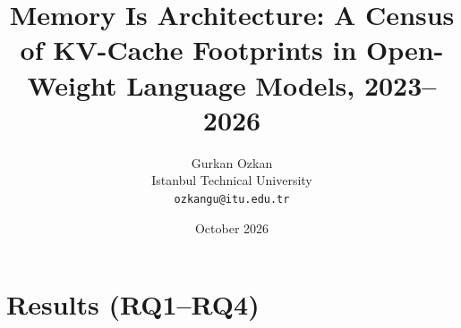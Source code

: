 \documentclass[10pt]{article}
\title{Memory Is Architecture: A Census of KV-Cache Footprints in
Open-Weight Language Models, 2023--2026}
\author{Gurkan Ozkan \\ Istanbul Technical University \\ \texttt{ozkangu@itu.edu.tr}}
\date{October 2026}
\begin{document}
\maketitle




\section{Results (RQ1--RQ4)}\label{sec:results}







\end{document}
